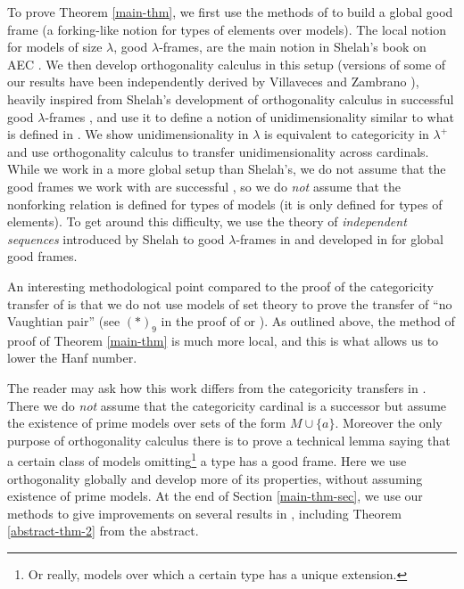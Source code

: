 \documentclass[12pt]{amsart}
\theoremstyle{definition}
\begin{document}
To prove Theorem \ref{main-thm}, we first use the methods of \cite{ss-tame-toappear-v3} to build a global good frame (a forking-like notion for types of elements over models). The local notion for models of size $\lambda$, good $\lambda$-frames, are the main notion in Shelah's book on AEC \cite{shelahaecbook}. We then develop orthogonality calculus in this setup (versions of some of our results have been independently derived by Villaveces and Zambrano \cite{viza}), heavily inspired from Shelah's development of orthogonality calculus in successful good $\lambda$-frames \cite[Section III.6]{shelahaecbook}, and use it to define a notion of unidimensionality similar to what is defined in \cite[Section III.2]{shelahaecbook}. We show unidimensionality in $\lambda$ is equivalent to categoricity in $\lambda^+$ and use orthogonality calculus to transfer unidimensionality across cardinals. While we work in a more global setup than Shelah's, we do not assume that the good frames we work with are successful \cite[Definition III.1.1]{shelahaecbook}, so we do \emph{not} assume that the nonforking relation is defined for types of models (it is only defined for types of elements). To get around this difficulty, we use the theory of \emph{independent sequences} introduced by Shelah to good $\lambda$-frames in \cite[Section III.5]{shelahaecbook} and developed in \cite{tame-frames-revisited-v4} for global good frames. 

An interesting methodological point compared to the proof of the categoricity transfer of \cite{sh394} is that we do not use models of set theory to prove the transfer of ``no Vaughtian pair'' (see $(\ast)_9$ in the proof of \cite[Theorem II.2.7]{sh394} or \cite[Theorem 14.12]{baldwinbook09}). As outlined above, the method of proof of Theorem \ref{main-thm} is much more local, and this is what allows us to lower the Hanf number.

The reader may ask how this work differs from the categoricity transfers in \cite{ap-universal-v8, categ-primes-v3}. There we do \emph{not} assume that the categoricity cardinal is a successor but assume the existence of prime models over sets of the form $M \cup \{a\}$. Moreover the only purpose of orthogonality calculus there is to prove a technical lemma saying that a certain class of models omitting\footnote{Or really, models over which a certain type has a unique extension.} a type has a good frame. Here we use orthogonality globally and develop more of its properties, without assuming existence of prime models. At the end of Section \ref{main-thm-sec}, we use our methods to give improvements on several results in \cite{indep-aec-v5,ap-universal-v8,categ-primes-v3}, including Theorem \ref{abstract-thm-2} from the abstract.
\end{document}
